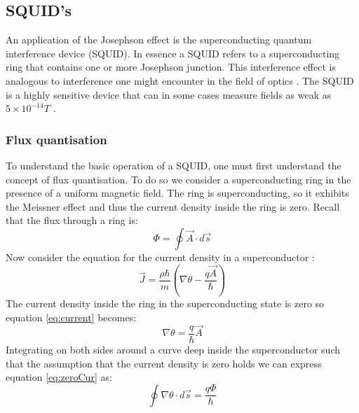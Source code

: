 \subsection{SQUID's}
An application of the Josephson effect is the superconducting quantum interference device (SQUID). In essence a SQUID refers to a superconducting ring that contains one or more Josephson junction. This interference effect is analogous to interference one might encounter in the field of optics \cite{DCSQUIDoriginalPaper}. The SQUID is a highly sensitive device that can in some cases measure fields as weak as $5\times 10^{-14} T$ \cite{Drung2016NBSQUIDS}.

\subsubsection*{Flux quantisation}
To understand the basic operation of a SQUID, one must first understand the concept of flux quantisation. To do so we consider a superconducting ring in the presence of a uniform magnetic field. The ring is superconducting, so it exhibits the Meissner effect and thus the current density inside the ring is zero. Recall that the flux through a ring is:
\begin{equation}
    \Phi = \oint \Vec{A} \cdot d\Vec{s}
\end{equation}
Now consider the equation for the current density in a superconductor \cite{Feynman_Leighton_Sands_2013}: 
\begin{equation}
    \Vec{J} = \frac{\rho\hbar}{m}(\nabla\theta - \frac{q\Vec{A}}{\hbar})
    \label{eq:current}
\end{equation}
The current density inside the ring in the superconducting state is zero so equation \ref{eq:current} becomes:
\begin{equation}
    \nabla\theta = \frac{q}{\hbar}\Vec{A}
    \label{eq:zeroCur}
\end{equation}
Integrating on both sides around a curve deep inside the superconductor such that the assumption that the current density is zero holds we can express equation \ref{eq:zeroCur} as:
\begin{equation}
    \oint\nabla\theta\cdot d\Vec{s} = \frac{q\Phi}{\hbar}
    \label{eq:intCurrent}
\end{equation}
